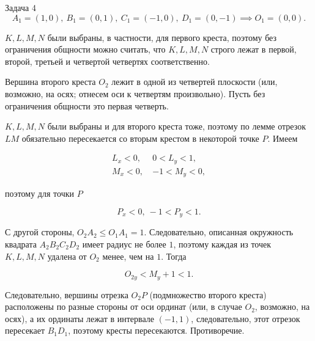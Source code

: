 \documentclass{article}
\begin{document}
\begin{section}{Задача 4}
		\begin{equation*}
			A_1 = (1, 0), \ B_1 = (0, 1), \ C_1 = (-1, 0), \ D_1 = (0, -1) \implies O_1 = (0, 0).
		\end{equation*}

		$K, L, M, N$ были выбраны, в частности, для первого креста, поэтому без ограничения общности можно считать, что $K, L, M, N$ строго лежат в первой, второй, третьей и четвертой четвертях соответственно.

		Вершина второго креста $O_2$ лежит в одной из четвертей плоскости (или, возможно, на осях; отнесем оси к четвертям произвольно). Пусть без ограничения общности это первая четверть.

		$K, L, M, N$ были выбраны и для второго креста тоже, поэтому по лемме отрезок $LM$ обязательно пересекается со вторым крестом в некоторой точке $P$. Имеем

		\begin{align*}
			L_x < 0, \ & 0 < L_y < 1, \\
			M_x < 0, \ & -1 < M_y < 0,
		\end{align*}

		поэтому для точки $P$

		\begin{equation*}
			P_x < 0, \ -1 < P_y < 1.
		\end{equation*}

		С другой стороны, $O_2 A_2 \le O_1 A_1 = 1$. Следовательно, описанная окружность квадрата $A_2 B_2 C_2 D_2$ имеет радиус не более $1$, поэтому каждая из точек $K, L, M, N$ удалена от $O_2$ менее, чем на $1$. Тогда

		\begin{equation*}
			O_{2y} < M_y + 1 < 1.
		\end{equation*}

		Следовательно, вершины отрезка $O_2 P$ (подмножество второго креста) расположены по разные стороны от оси ординат (или, в случае $O_2$, возможно, на осях), а их ординаты лежат в интервале $(-1, 1)$, следовательно, этот отрезок пересекает $B_1 D_1$, поэтому кресты пересекаются. Противоречие.
	\end{section}
\end{document}
